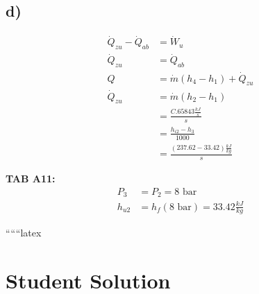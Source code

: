 

\subsection*{d)}

\begin{align*}
    \dot{Q}_{zu} - \dot{Q}_{ab} &= \dot{W}_u \\
    \dot{Q}_{zu} &= \dot{Q}_{ab} \\
    Q &= \dot{m} (h_4 - h_1) + \dot{Q}_{zu} \\
    \dot{Q}_{zu} &= \dot{m} (h_2 - h_1) \\
    &= \frac{C.65843 \frac{kJ}{s}}{s} \\
    &= \frac{h_{i2} - h_3}{1000} \\
    &= \frac{(237.62 - 33.42) \frac{kJ}{kg}}{s}
\end{align*}

\textbf{TAB A11:}
\begin{align*}
    P_3 &= P_2 = 8 \text{ bar} \\
    h_{u2} &= h_f (8 \text{ bar}) = 33.42 \frac{kJ}{kg}
\end{align*}

``````latex


\section*{Student Solution}